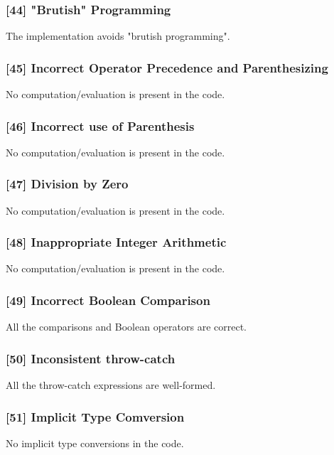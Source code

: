 \subsubsection{[44] "Brutish" Programming}
The implementation avoids "brutish programming".
\subsubsection{[45] Incorrect Operator Precedence and Parenthesizing}
No computation/evaluation is present in the code.

\subsubsection{[46] Incorrect use of Parenthesis}
No computation/evaluation is present in the code.

\subsubsection{[47] Division by Zero}
No computation/evaluation is present in the code.

\subsubsection{[48] Inappropriate Integer Arithmetic}
No computation/evaluation is present in the code.

\subsubsection{[49] Incorrect Boolean Comparison}
All the comparisons and Boolean operators are correct.

\subsubsection{[50] Inconsistent throw-catch}
All the throw-catch expressions are well-formed. 

\subsubsection{[51] Implicit Type Comversion}
No implicit type conversions in the code. %
